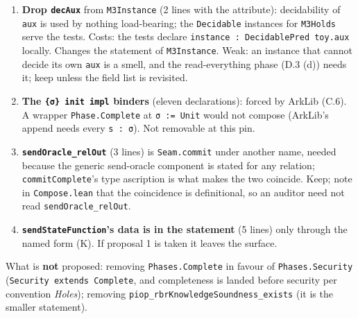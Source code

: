 \begin{enumerate}
\item \textbf{Drop \texttt{decAux}} from \texttt{M3Instance} (2 lines with the attribute): decidability of \texttt{aux} is used by nothing load-bearing; the \texttt{Decidable} instances for \texttt{M3Holds} serve the tests. Costs: the tests declare \texttt{i\allowbreak{}n\allowbreak{}s\allowbreak{}t\allowbreak{}a\allowbreak{}n\allowbreak{}c\allowbreak{}e\allowbreak{} :\allowbreak{} D\allowbreak{}e\allowbreak{}c\allowbreak{}i\allowbreak{}d\allowbreak{}a\allowbreak{}b\allowbreak{}l\allowbreak{}e\allowbreak{}P\allowbreak{}r\allowbreak{}e\allowbreak{}d\allowbreak{} t\allowbreak{}o\allowbreak{}y\allowbreak{}.\allowbreak{}a\allowbreak{}u\allowbreak{}x} locally. Changes the statement of \texttt{M3Instance}. Weak: an instance that cannot decide its own \texttt{aux} is a smell, and the read-everything phase (D.3 (d)) needs it; keep unless the field list is revisited.
\item \textbf{The \texttt{\{σ\} init impl} binders} (eleven declarations): forced by ArkLib (C.6). A wrapper \texttt{Phase.\allowbreak{}Complete\textquotesingle{}} at \texttt{σ := Unit} would not compose (ArkLib's append needs every \texttt{s : σ}). Not removable at this pin.
\item \textbf{\texttt{sendOracle\_\allowbreak{}relOut}} (3 lines) is \texttt{Seam.\allowbreak{}commit} under another name, needed because the generic send-oracle component is stated for any relation; \texttt{commitComplete}'s type ascription is what makes the two coincide. Keep; note in \texttt{Compose.\allowbreak{}lean} that the coincidence is definitional, so an auditor need not read \texttt{sendOracle\_\allowbreak{}relOut}.
\item \textbf{\texttt{sendStateFunction}'s data is in the statement} (5 lines) only through the named form (K). If proposal 1 is taken it leaves the surface.
\end{enumerate}

What is \textbf{not} proposed: removing \texttt{Phases.\allowbreak{}Complete} in favour of \texttt{Phases.\allowbreak{}Security} (\texttt{Security extends Complete}, and completeness is landed before security per convention \emph{Holes}); removing \texttt{p\allowbreak{}i\allowbreak{}o\allowbreak{}p\allowbreak{}\_\allowbreak{}r\allowbreak{}b\allowbreak{}r\allowbreak{}K\allowbreak{}n\allowbreak{}o\allowbreak{}w\allowbreak{}l\allowbreak{}e\allowbreak{}d\allowbreak{}g\allowbreak{}e\allowbreak{}S\allowbreak{}o\allowbreak{}u\allowbreak{}n\allowbreak{}d\allowbreak{}n\allowbreak{}e\allowbreak{}s\allowbreak{}s\allowbreak{}\_\allowbreak{}e\allowbreak{}x\allowbreak{}i\allowbreak{}s\allowbreak{}t\allowbreak{}s} (it is the smaller statement).


